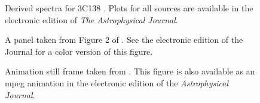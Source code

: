 \documentclass[manuscript]{aastex}
\begin{document}

\begin{figure}
\caption{Derived spectra for 3C138 \citep[see][]{heiles03}. Plots for all sources are available
in the electronic edition of {\it The Astrophysical Journal}.\label{fig1}}
\end{figure}

\clearpage


\begin{figure}
\caption{A panel taken from Figure 2 of \citet{rudnick03}. 
See the electronic edition of the Journal for a color version 
of this figure.\label{fig2}}
\end{figure}


\begin{figure}
\caption{Animation still frame taken from \citet{kim03}.
This figure is also available as an mpeg
animation in the electronic edition of the
{\it Astrophysical Journal}.}
\end{figure}




\end{document}
